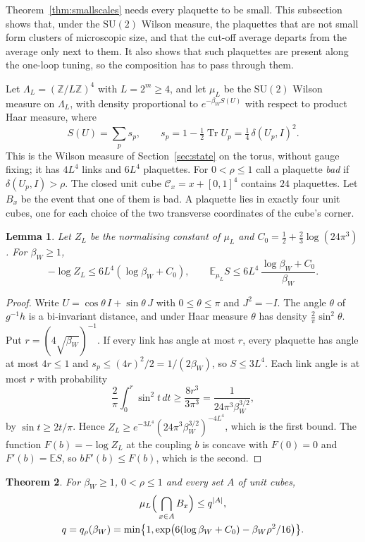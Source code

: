 \documentclass[11pt]{amsart}
\newtheorem{theorem}{Theorem}[section]
\newtheorem{lemma}[theorem]{Lemma}
\theoremstyle{definition}
\theoremstyle{remark}
\numberwithin{equation}{section}
\newcommand{\Z}{\mathbb{Z}}
\newcommand{\E}{\mathbb{E}}
\newcommand{\SU}{\mathrm{SU}}
\newcommand{\Tr}{\operatorname{Tr}}
\begin{document}
Theorem~\ref{thm:smallscales} needs every plaquette to be small. This
subsection shows that, under the $\SU(2)$ Wilson measure, the plaquettes
that are not small form clusters of microscopic size, and that the cut-off
average departs from the average only next to them. It also shows that
such plaquettes are present along the one-loop tuning, so the composition
has to pass through them.

Let $\Lambda_L=(\Z/L\Z)^4$ with $L=2^m\ge4$, and let $\mu_L$ be the $\SU(2)$
Wilson measure on $\Lambda_L$, with density proportional to $e^{-\beta_W
S(U)}$ with respect to product Haar measure, where
\[
S(U)=\sum_ps_p,\qquad s_p=1-\tfrac12\Tr U_p=\tfrac14\,\delta(U_p,I)^2 .
\]
This is the Wilson measure of Section~\ref{sec:state} on the torus, without
gauge fixing; it has $4L^4$ links and $6L^4$ plaquettes. For $0<\rho\le1$ call a
plaquette \emph{bad} if $\delta(U_p,I)>\rho$. The closed unit cube $\mathcal
C_x=x+[0,1]^4$ contains $24$ plaquettes. Let $B_x$ be the event that one of
them is bad. A plaquette lies in exactly four unit cubes, one for each
choice of the two transverse coordinates of the cube's corner.

\begin{lemma}\label{lem:wilsonZ}
Let $Z_L$ be the normalising constant of $\mu_L$ and $C_0=\frac12+\frac23
\log(24\pi^3)$. For $\beta_W\ge1$,
\[
-\log Z_L\le6L^4(\log\beta_W+C_0),\qquad
\E_{\mu_L}S\le6L^4\,\frac{\log\beta_W+C_0}{\beta_W}.
\]
\end{lemma}

\begin{proof}
Write $U=\cos\theta\,I+\sin\theta\,J$ with $0\le\theta\le\pi$ and $J^2=-I$.
The angle $\theta$ of $g^{-1}h$ is a bi-invariant distance, and under Haar
measure $\theta$ has density $\frac2\pi\sin^2\theta$. Put $r=(4\sqrt{
\beta_W})^{-1}$. If every link has angle at most $r$, every plaquette has
angle at most $4r\le1$ and $s_p\le(4r)^2/2=1/(2\beta_W)$, so $S\le3L^4$.
Each link angle is at most $r$ with probability
\[
\frac2\pi\int_0^r\sin^2t\,dt\ge\frac{8r^3}{3\pi^3}=\frac1{24\pi^3
\beta_W^{3/2}},
\]
by $\sin t\ge2t/\pi$. Hence $Z_L\ge e^{-3L^4}(24\pi^3\beta_W^{3/2})^{-4L^4}$,
which is the first bound. The function $F(b)=-\log Z_L$ at the coupling $b$
is concave with $F(0)=0$ and $F'(b)=\E S$, so $bF'(b)\le F(b)$, which is
the second.
\end{proof}

\begin{theorem}\label{thm:defects}
For $\beta_W\ge1$, $0<\rho\le1$ and every set $A$ of unit cubes,
\begin{gather*}
\mu_L\Bigl(\,\bigcap_{x\in A}B_x\Bigr)\le q^{|A|},\\
q=q_\rho(\beta_W)=\min\bigl\{1,\exp\bigl(6(\log\beta_W+C_0)-\beta_W
\rho^2/16\bigr)\bigr\}.
\end{gather*}
\end{theorem}
\end{document}
